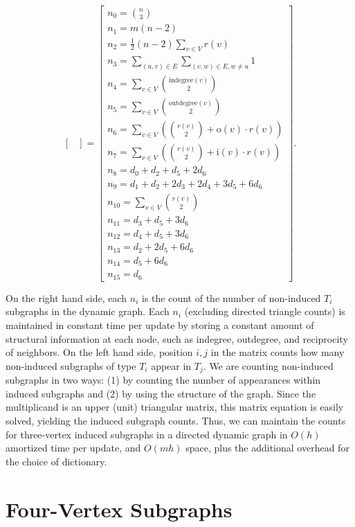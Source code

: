 \documentclass[11pt]{article}
\begin{document}
{\[\begin{bmatrix}
\end{bmatrix}
=
\begin{bmatrix}
n_0 = \binom{n}{3} \\
n_1 = m(n-2) \\
n_2 = \frac{1}{2}(n-2)\sum_{v\in V}r(v) \\
n_3 = \sum_{(u,v)\in E}\sum_{(v,w)\in E, w\neq u}1 \\
n_4 = \sum_{v\in V}\binom{\mathrm{indegree}(v)}{2} \\
n_5 = \sum_{v\in V}\binom{\mathrm{outdegree}(v)}{2} \\
n_6 = \sum_{v\in V}(\binom{r(v)}{2} + \mathrm{o}(v)\cdot r(v)) \\
n_7 = \sum_{v\in V}(\binom{r(v)}{2} + \mathrm{i}(v)\cdot r(v)) \\
n_8 = d_0 + d_2 + d_5 + 2d_6 \\
n_9 = d_1 + d_2 + 2d_3 + 2d_4 + 3d_5 + 6d_6 \\
n_{10} = \sum_{v\in V}\binom{r(v)}{2} \\
n_{11} = d_3 + d_5 + 3d_6 \\
n_{12} = d_4 + d_5 + 3d_6 \\
n_{13} = d_2 + 2d_5 + 6d_6 \\
n_{14} = d_5 + 6d_6 \\
n_{15} = d_6
\end{bmatrix}.
\]
}

On the right hand side, each $n_i$ is the count of the number of
non-induced $T_i$ subgraphs in the dynamic graph. Each $n_i$ (excluding
directed triangle counts) is maintained in constant time per update by 
storing a constant amount of structural information at each node, 
such as indegree, outdegree, and reciprocity of neighbors. On the left 
hand side, position $i,j$ in the matrix counts how many non-induced 
subgraphs of type $T_i$ appear in $T_j$. We are counting non-induced 
subgraphs in two ways: (1) by counting the number of appearances within 
induced subgraphs and (2) by using the structure of the graph. Since 
the multiplicand is an upper (unit) triangular matrix, this matrix 
equation is easily solved, yielding the induced subgraph counts. Thus,
we can maintain the counts for three-vertex induced subgraphs in a directed
dynamic graph in $O(h)$ amortized time per update, and $O(mh)$ space, 
plus the additional overhead for the choice of dictionary.


\section{Four-Vertex Subgraphs}
\end{document}
